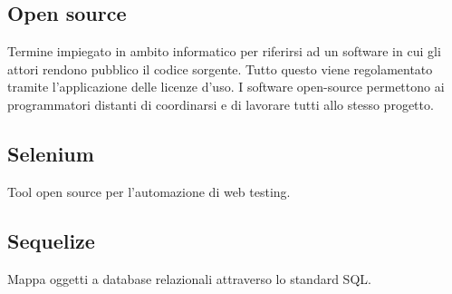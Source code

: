 \documentclass[../manuale_sviluppatore.tex]{subfiles}
\begin{document}
\subsection*{Open source}
{}
Termine impiegato in ambito informatico per riferirsi ad un software in cui gli attori rendono pubblico il codice sorgente. 
Tutto questo viene regolamentato tramite l’applicazione delle licenze d’uso. 
I software open-source permettono ai programmatori distanti di coordinarsi e di lavorare tutti allo stesso progetto.

\subsection*{Selenium}
{}
Tool open source per l'automazione di web testing.

\subsection*{Sequelize}
{}
Mappa oggetti a database relazionali attraverso lo standard SQL.
\end{document}

